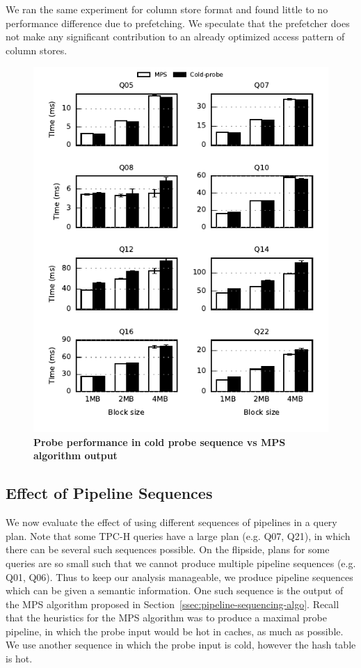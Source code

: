 We ran the same experiment for column store format and found little to no performance difference due to prefetching. 
We speculate that the prefetcher does not make any significant contribution to an already optimized access pattern of column stores.
\begin{figure}[ht]
	\centering 
	\includegraphics{pipeline/figures/first-probe-comparison-mps-vs-coldprobe-20threads-colstore-withlip}
	\caption{\textbf{Probe performance in cold probe sequence vs MPS algorithm output}}
	\label{fig:coldprobe-vs-mps}
\end{figure}

\subsection{Effect of Pipeline Sequences}
We now evaluate the effect of using different sequences of pipelines in a query plan. 
Note that some TPC-H queries have a large plan (e.g. Q07, Q21), in which there can be several such sequences possible.
On the flipside, plans for some queries are so small such that we cannot produce multiple pipeline sequences (e.g. Q01, Q06).
Thus to keep our analysis manageable, we produce pipeline sequences which can be given a semantic information. 
One such sequence is the output of the MPS algorithm proposed in Section~\ref{ssec:pipeline-sequencing-algo}.
Recall that the heuristics for the MPS algorithm was to produce a maximal probe pipeline, in which the probe input would be hot in caches, as much as possible.
We use another sequence in which the probe input is cold, however the hash table is hot. 

